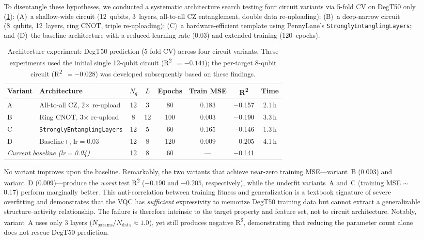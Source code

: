 \documentclass[twoside,twocolumn,9pt]{article}
\newcommand{\degtl}{DegT50}
\newcommand{\rtwo}{R\textsuperscript{2}}
\begin{document}
To disentangle these hypotheses, we conducted a systematic architecture
search testing four circuit variants via 5-fold CV on \degtl{} only
(\ref{tab:arch}): (A)~a shallow-wide circuit (12~qubits, 3~layers,
all-to-all CZ entanglement, double data re-uploading); (B)~a deep-narrow
circuit (8~qubits, 12~layers, ring CNOT, triple re-uploading);
(C)~a hardware-efficient template using PennyLane's
\texttt{StronglyEntanglingLayers}; and (D)~the baseline architecture with
a reduced learning rate (0.03) and extended training (120~epochs).

\begin{table}[htbp]
  \centering
  \caption{Architecture experiment: DegT50 prediction (5-fold CV) across
           four circuit variants. These experiments used the initial single
           12-qubit circuit (\rtwo{}~$= -0.141$); the per-target 8-qubit
           circuit (\rtwo{}~$= -0.028$) was developed subsequently based on
           these findings.}
  \label{tab:arch}
  \small
  \begin{tabular}{llcccccc}
    \toprule
    \textbf{Variant} & \textbf{Architecture} & \textbf{$N_q$} &
      \textbf{$L$} & \textbf{Epochs} &
      \textbf{Train MSE} & \textbf{\rtwo{}} & \textbf{Time} \\
    \midrule
    A & All-to-all CZ, 2$\times$ re-upload  & 12 & 3  & 80  & 0.183 & $-$0.157 & 2.1\,h \\
    B & Ring CNOT, 3$\times$ re-upload       &  8 & 12 & 100 & 0.003 & $-$0.190 & 3.3\,h \\
    C & \texttt{StronglyEntanglingLayers}    & 12 & 5  & 60  & 0.165 & $-$0.146 & 1.3\,h \\
    D & Baseline+, lr$=$0.03                 & 12 & 8  & 120 & 0.009 & $-$0.205 & 4.1\,h \\
    \midrule
    \multicolumn{2}{l}{\emph{Current baseline (lr$=$0.04)}} & 12 & 8 & 60
      & --- & $-$0.141 \\
    \bottomrule
  \end{tabular}
\end{table}

No variant improves upon the baseline. Remarkably, the two variants that
achieve near-zero training MSE---variant~B (0.003) and variant~D
(0.009)---produce the \emph{worst} test \rtwo{} ($-0.190$ and $-0.205$,
respectively), while the underfit variants~A and~C (training MSE $\sim$0.17)
perform marginally better. This anti-correlation between training fitness
and generalization is a textbook signature of severe overfitting and
demonstrates that the VQC has \emph{sufficient} expressivity to memorize
\degtl{} training data but cannot extract a generalizable
structure--activity relationship. The failure is therefore intrinsic to the
target property and feature set, not to circuit architecture. Notably,
variant~A uses only 3 layers ($N_\text{params}/N_\text{data} \approx 1.0$),
yet still produces negative \rtwo{}, demonstrating that reducing the
parameter count alone does not rescue \degtl{} prediction.
\end{document}
